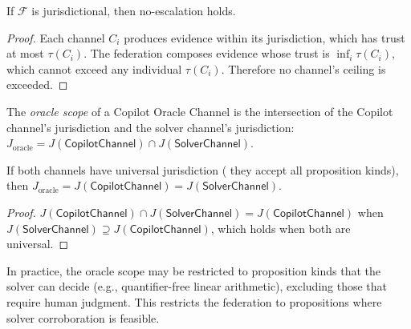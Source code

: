 \documentclass[11pt]{article}
\newcommand{\CopChan}{\mathsf{CopilotChannel}}
\newcommand{\SolChan}{\mathsf{SolverChannel}}
\begin{document}
\begin{lemma}
\label{lem:juris-noescal}
If $\mathcal{F}$ is jurisdictional, then no-escalation holds.
\end{lemma}

\begin{proof}
Each channel $C_i$ produces evidence within its jurisdiction,
which has trust at most $\tau(C_i)$.  The federation composes
evidence whose trust is $\inf_i \tau(C_i)$, which cannot exceed
any individual $\tau(C_i)$.  Therefore no channel's ceiling is
exceeded.
\end{proof}

\begin{definition}
\label{def:oracle-scope}
The \emph{oracle scope} of a Copilot Oracle Channel is the
intersection of the Copilot channel's jurisdiction and the
solver channel's jurisdiction:
$J_{\mathrm{oracle}} = J(\CopChan) \cap J(\SolChan)$.
\end{definition}

\begin{lemma}
\label{lem:oracle-nonempty}
If both channels have universal jurisdiction (\ie{} they accept
all proposition kinds), then $J_{\mathrm{oracle}} = J(\CopChan) = J(\SolChan)$.
\end{lemma}

\begin{proof}
$J(\CopChan) \cap J(\SolChan) = J(\CopChan)$ when
$J(\SolChan) \supseteq J(\CopChan)$, which holds when
both are universal.
\end{proof}

\begin{remark}
In practice, the oracle scope may be restricted to
proposition kinds that the solver can decide (e.g., quantifier-free
linear arithmetic), excluding those that require human
judgment.  This restricts the federation to propositions
where solver corroboration is feasible.
\end{remark}
\end{document}
